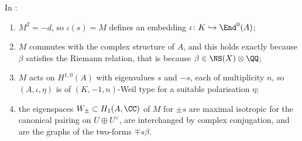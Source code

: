 \begin{theorem}\label{thm:explicitweil}
In :
\begin{enumerate}[label=\textup{(\roman*)}]
\item $M^{2}=-d$, so $\iota(s)=M$ defines an embedding
  $\iota\colon K\hookrightarrow\End^{0}(A)$;
\item $M$ commutes with the complex structure of $A$, and this holds exactly
  because $\beta$ satisfies the Riemann relation, that is because
  $\beta\in\NS(X)\otimes\QQ$;
\item $M$ acts on $H^{1,0}(A)$ with eigenvalues $s$ and $-s$, each of
  multiplicity $n$, so $(A,\iota,\eta)$ is of $(K,-1,n)$-Weil type for a
  suitable polarisation $\eta$;
\item the eigenspaces $W_{\pm}\subset H_{1}(A,\CC)$ of $M$ for $\pm s$ are
  maximal isotropic for the canonical pairing on $U\oplus U^{\vee}$, are
  interchanged by complex conjugation, and are the graphs of the two-forms
  $\mp s\beta$.
\end{enumerate}
\end{theorem}

